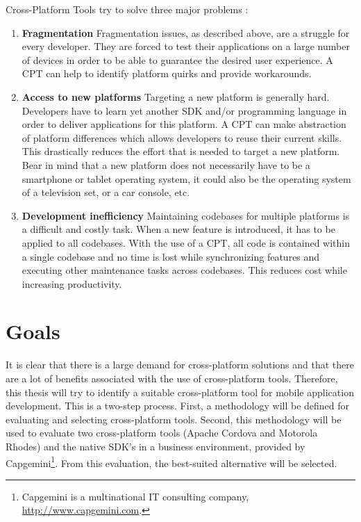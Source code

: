 Cross-Platform Tools try to solve three major problems \cite{VMCPT:2012}: 

\begin{enumerate}
    \item \textbf{Fragmentation} Fragmentation issues, as described above, are a struggle for every developer. They are forced to test their applications on a large number of devices in order to be able to guarantee the desired user experience. A CPT can help to identify platform quirks and provide workarounds. 
    \item \textbf{Access to new platforms} Targeting a new platform is generally hard. Developers have to learn yet another SDK and/or programming language in order to deliver applications for this platform. A CPT can make abstraction of platform differences which allows developers to reuse their current skills. This drastically reduces the effort that is needed to target a new platform. Bear in mind that a new platform does not necessarily have to be a smartphone or tablet operating system, it could also be the operating system of a television set, or a car console, etc.
    \item \textbf{Development inefficiency} Maintaining codebases for multiple platforms is a difficult and costly task. When a new feature is introduced, it has to be applied to all codebases. With the use of a CPT, all code is contained within a single codebase and no time is lost while synchronizing features and executing other maintenance tasks across codebases. This reduces cost while increasing productivity. 
\end{enumerate}

\section{Goals}

It is clear that there is a large demand for cross-platform solutions and that there are a lot of benefits associated with the use of cross-platform tools. Therefore, this thesis will try to identify a suitable cross-platform tool for mobile application development. This is a two-step process. First, a methodology will be defined for evaluating and selecting cross-platform tools. Second, this methodology will be used to evaluate two cross-platform tools (Apache Cordova and Motorola Rhodes) and the native SDK's in a business environment, provided by Capgemini\footnote{Capgemini is a multinational IT consulting company, \url{http://www.capgemini.com}.}. From this evaluation, the best-suited alternative will be selected. 